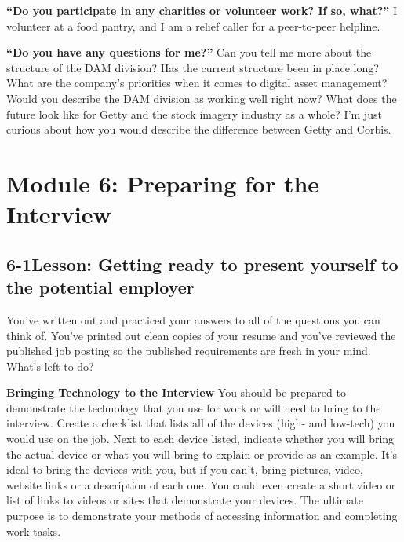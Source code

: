 \textbf{``Do you participate in any charities or volunteer work? If so, what?''}
\break I volunteer at a food pantry, and I am a relief caller for a peer-to-peer helpline.

\textbf{``Do you have any questions for me?''}
\break Can you tell me more about the structure of the DAM division? 
\break Has the current structure been in place long? 
\break What are the company's priorities when it comes to digital asset management?
\break Would you describe the DAM division as working well right now?
\break What does the future look like for Getty and the stock imagery industry as a whole?
\break I'm just curious about how you would describe the difference between Getty and Corbis.
 
 
\pagebreak \section*{Module 6:	Preparing for the Interview}
\noindent\makebox[\textwidth]{\rule{\linewidth}{0.4pt}}  \localtableofcontents 
\noindent\makebox[\textwidth]{\rule{\linewidth}{0.4pt}} 


\pagebreak \subsection*{6-1\quad Lesson: Getting ready to present yourself to the potential employer}
You've written out and practiced your answers to all of the questions you can think of. You've printed out clean copies of your resume and you've reviewed the published job posting so the published requirements are fresh in your mind. What's left to do?

\textbf{Bringing Technology to the Interview}
\break You should be prepared to demonstrate the technology that you use for work or will need to bring to the interview. Create a checklist that lists all of the devices (high- and low-tech) you would use on the job. Next to each device listed, indicate whether you will bring the actual device or what you will bring to explain or provide as an example. It's ideal to bring the devices with you, but if you can't, bring pictures, video, website links or a description of each one. You could even create a short video or list of links to videos or sites that demonstrate your devices. The ultimate purpose is to demonstrate your methods of accessing information and completing work tasks.

